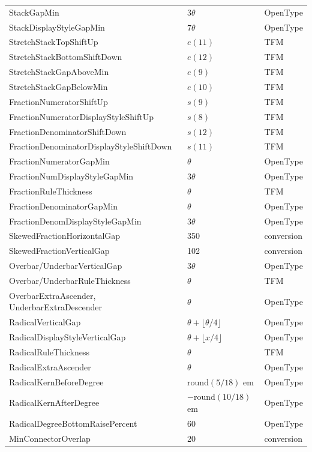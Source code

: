 \documentclass[10pt]{article}
\begin{document}
\begin{longtable}{>{\raggedright\arraybackslash}p{}ll}
StackGapMin & $3\theta$ & OpenType \\
StackDisplayStyleGapMin & $7\theta$ & OpenType \\
StretchStackTopShiftUp & $e(11)$ & TFM \\
StretchStackBottomShiftDown & $e(12)$ & TFM \\
StretchStackGapAboveMin & $e(9)$ & TFM \\
StretchStackGapBelowMin & $e(10)$ & TFM \\
FractionNumeratorShiftUp & $s(9)$ & TFM \\
FractionNumeratorDisplayStyleShiftUp & $s(8)$ & TFM \\
FractionDenominatorShiftDown & $s(12)$ & TFM \\
FractionDenominatorDisplayStyleShiftDown & $s(11)$ & TFM \\
FractionNumeratorGapMin & $\theta$ & OpenType \\
FractionNumDisplayStyleGapMin & $3\theta$ & OpenType \\
FractionRuleThickness & $\theta$ & TFM \\
FractionDenominatorGapMin & $\theta$ & OpenType \\
FractionDenomDisplayStyleGapMin & $3\theta$ & OpenType \\
SkewedFractionHorizontalGap & 350 & conversion \\
SkewedFractionVerticalGap & 102 & conversion \\
Overbar/UnderbarVerticalGap & $3\theta$ & OpenType \\
Overbar/UnderbarRuleThickness & $\theta$ & TFM \\
OverbarExtraAscender, UnderbarExtraDescender & $\theta$ & OpenType \\
RadicalVerticalGap & $\theta + \lfloor\theta/4\rfloor$ & OpenType \\
RadicalDisplayStyleVerticalGap & $\theta + \lfloor x/4\rfloor$ & OpenType \\
RadicalRuleThickness & $\theta$ & TFM \\
RadicalExtraAscender & $\theta$ & OpenType \\
RadicalKernBeforeDegree & $\mathrm{round}(5/18)$ em & OpenType \\
RadicalKernAfterDegree & $-\mathrm{round}(10/18)$ em & OpenType \\
RadicalDegreeBottomRaisePercent & 60 & OpenType \\
MinConnectorOverlap & 20 & conversion \\
\bottomrule
\end{longtable}
\end{document}
